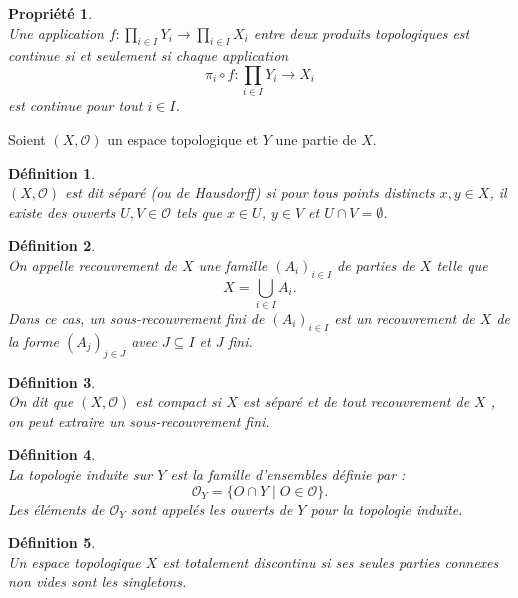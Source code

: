 \documentclass[a4paper, 14pt]{report}
\newtheorem{definition}{Définition}[section]
\newtheorem{propriety}{Propriété}[section]
\begin{document}
\begin{onehalfspace}
{\begin{propriety}  \cite{bourbaki2013general}\\
Une application \( f:  \prod_{i \in I} Y_i \to \prod_{i \in I} X_i \) entre deux produits topologiques est continue si et seulement si chaque application  
\[
\pi_i \circ f: \prod_{i \in I} Y_i \to X_i
\]
est continue pour tout \( i \in I \).
\end{propriety}

Soient \( (X, \mathcal{O})\) un espace topologique et \( Y \) une partie de \( X \).

\begin{definition}\cite{bourbaki2013general}\\
	\( (X, \mathcal{O}) \) est dit séparé (ou de Hausdorff) si pour tous points distincts \( x, y \in X \), il existe des ouverts \( U, V \in \mathcal{O} \) tels que \( x \in U \), \( y \in V \) et \( U \cap V = \emptyset \).
\end{definition}


\begin{definition} \cite{kuratowski2014topology}\\
On appelle recouvrement de \( X \) une famille \( (A_i)_{i \in I} \) de parties de \( X \) telle que 
	\[
	X = \bigcup_{i \in I} A_i.
	\]
Dans ce cas, un sous-recouvrement fini de \( (A_i)_{i \in I} \) est un recouvrement de \( X \) de la forme \( (A_j)_{j \in J} \) avec \( J \subseteq I \) et \(J\) fini.
\end{definition}

\begin{definition} \cite{kuratowski2014topology}\\
On dit que \( (X, \mathcal{O})\) est compact si \( X \) est séparé et de tout recouvrement de \( X \) , on peut extraire un sous-recouvrement fini.
\end{definition}


\begin{definition} \cite{kuratowski2014topology}\\
	La topologie induite sur \( Y \) est la famille d’ensembles définie par :
	\[
	\mathcal{O}_Y = \{ O \cap Y \mid O \in \mathcal{O} \}.
	\]
Les éléments de \( \mathcal{O}_Y \) sont appelés les ouverts de \( Y \) pour la topologie induite.
\end{definition}

\begin{definition} \cite{kuratowski2014topology}\\
Un espace topologique \( X \) est totalement discontinu si ses seules parties connexes non vides sont les singletons.
\end{definition}


}
\end{onehalfspace}
\end{document}
